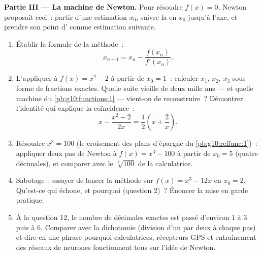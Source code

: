 \begin{problem}
\medskip
\noindent\textbf{Partie III --- La machine de Newton.}
Pour résoudre $f(x) = 0$, Newton proposait ceci~: partir d'une
estimation $x_0$, suivre la  en $x_0$ jusqu'à l'axe, et
prendre son point d' comme estimation suivante.
\begin{enumerate}[resume]
  \item Établir la formule de la méthode~:
        \[
        x_{n + 1} = x_n - \frac{f(x_n)}{f'(x_n)} .
        \]
  \item L'appliquer à $f(x) = x^2 - 2$ à partir de $x_0 = 1$~:
        calculer $x_1$, $x_2$, $x_3$ sous forme de fractions
        exactes. Quelle suite vieille de deux mille ans --- et
        quelle machine du \cref{pb:g10:functions:1} --- vient-on de
        reconstruire~? Démontrer l'identité qui explique la
        coïncidence~:
        \[
        x - \frac{x^2 - 2}{2x} = \frac12\left(x +
        \frac2x\right).
        \]
  \item Résoudre $x^3 = 100$ (le croisement des plans d'épargne du
        \cref{pb:g10:reffunc:1})~: appliquer deux pas de Newton à
        $f(x) = x^3 - 100$ à partir de $x_0 = 5$ (quatre
        décimales), et comparer avec le $\sqrt[3]{100}$ de la
        calculatrice.
  \item Sabotage~: essayer de lancer la méthode sur
        $f(x) = x^3 - 12x$ en $x_0 = 2$. Qu'est-ce qui échoue, et
        pourquoi (question 2)~? Énoncer la mise en garde pratique.
  \item À la question 12, le nombre de décimales exactes est passé
        d'environ $1$ à $3$ puis à $6$. Comparer avec la dichotomie
        (division d'un  par deux à chaque pas) et dire en
        une phrase pourquoi calculatrices, récepteurs GPS et
        entraînement des réseaux de neurones fonctionnent tous sur
        l'idée de Newton.
\end{enumerate}


\end{problem}
